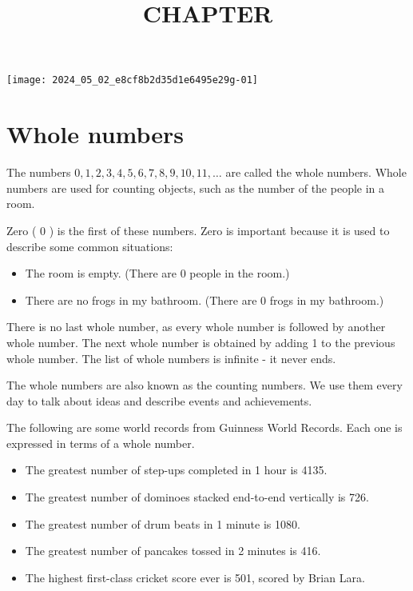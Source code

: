 \documentclass[10pt]{article}
\title{CHAPTER }
\author{}
\date{}
\begin{document}
\maketitle
\begin{center}
\texttt{[image: 2024\_05\_02\_e8cf8b2d35d1e6495e29g-01]}
\end{center}

\section*{Whole numbers}
The numbers \(0,1,2,3,4,5,6,7,8,9,10,11, \ldots\) are called the whole numbers. Whole numbers are used for counting objects, such as the number of the people in a room.

Zero ( 0 ) is the first of these numbers. Zero is important because it is used to describe some common situations:

\begin{itemize}
  \item The room is empty. (There are 0 people in the room.)
  \item There are no frogs in my bathroom. (There are 0 frogs in my bathroom.)
\end{itemize}

There is no last whole number, as every whole number is followed by another whole number. The next whole number is obtained by adding 1 to the previous whole number. The list of whole numbers is infinite - it never ends.

The whole numbers are also known as the counting numbers. We use them every day to talk about ideas and describe events and achievements.

The following are some world records from Guinness World Records. Each one is expressed in terms of a whole number.

\begin{itemize}
  \item The greatest number of step-ups completed in 1 hour is 4135.
  \item The greatest number of dominoes stacked end-to-end vertically is 726.
  \item The greatest number of drum beats in 1 minute is 1080.
  \item The greatest number of pancakes tossed in 2 minutes is 416.
  \item The highest first-class cricket score ever is 501, scored by Brian Lara.
\end{itemize}
\end{document}
